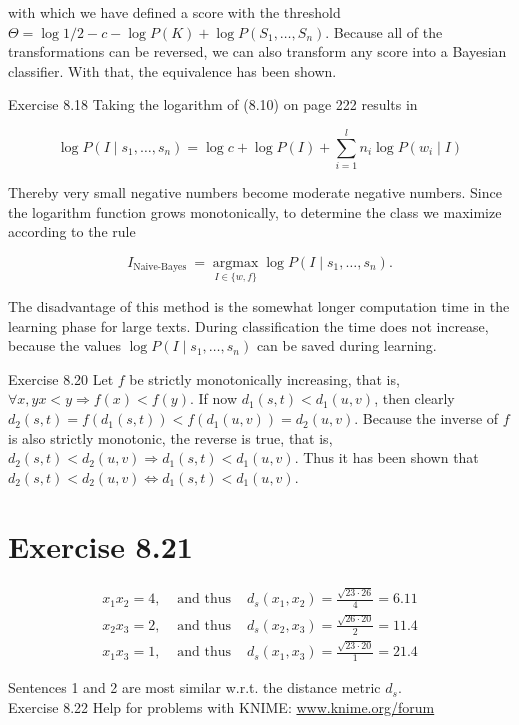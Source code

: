 \documentclass[10pt]{book}
\begin{document}
with which we have defined a score with the threshold $\Theta=\log 1 / 2-c-\log P(K)+ \log P\left(S_{1}, \ldots, S_{n}\right)$. Because all of the transformations can be reversed, we can also transform any score into a Bayesian classifier. With that, the equivalence has been shown.

Exercise 8.18 Taking the logarithm of (8.10) on page 222 results in

$$
\log P\left(I \mid s_{1}, \ldots, s_{n}\right)=\log c+\log P(I)+\sum_{i=1}^{l} n_{i} \log P\left(w_{i} \mid I\right)
$$

Thereby very small negative numbers become moderate negative numbers. Since the logarithm function grows monotonically, to determine the class we maximize according to the rule

$$
I_{\text {Naive-Bayes }}=\underset{I \in\{w, f\}}{\operatorname{argmax}} \log P\left(I \mid s_{1}, \ldots, s_{n}\right) .
$$

The disadvantage of this method is the somewhat longer computation time in the learning phase for large texts. During classification the time does not increase, because the values $\log P\left(I \mid s_{1}, \ldots, s_{n}\right)$ can be saved during learning.

Exercise 8.20 Let $f$ be strictly monotonically increasing, that is, $\forall x, y x<y \Rightarrow f(x)<f(y)$. If now $d_{1}(s, t)<d_{1}(u, v)$, then clearly $d_{2}(s, t)=f\left(d_{1}(s, t)\right)<f\left(d_{1}(u, v)\right)= d_{2}(u, v)$. Because the inverse of $f$ is also strictly monotonic, the reverse is true, that is, $d_{2}(s, t)<d_{2}(u, v) \Rightarrow d_{1}(s, t)<d_{1}(u, v)$. Thus it has been shown that $d_{2}(s, t)< d_{2}(u, v) \Leftrightarrow d_{1}(s, t)<d_{1}(u, v)$.

\section*{Exercise 8.21}
$$
\begin{array}{lll}
x_{1} x_{2}=4, & \text { and thus } & d_{s}\left(x_{1}, x_{2}\right)=\frac{\sqrt{23 \cdot 26}}{4}=6.11 \\
x_{2} x_{3}=2, & \text { and thus } & d_{s}\left(x_{2}, x_{3}\right)=\frac{\sqrt{26 \cdot 20}}{2}=11.4 \\
x_{1} x_{3}=1, & \text { and thus } & d_{s}\left(x_{1}, x_{3}\right)=\frac{\sqrt{23 \cdot 20}}{1}=21.4
\end{array}
$$

Sentences 1 and 2 are most similar w.r.t. the distance metric $d_{s}$.\\
Exercise 8.22 Help for problems with KNIME: \href{http://www.knime.org/forum}{www.knime.org/forum}
\end{document}

